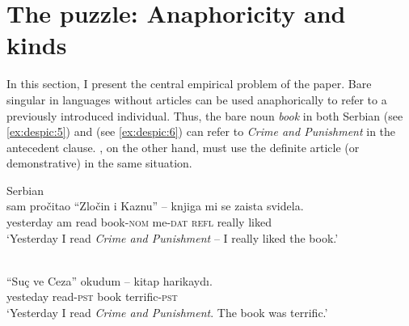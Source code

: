 \documentclass[output=paper,
modfonts
]{langscibook}
\begin{document}
	\section{The puzzle: Anaphoricity and kinds } \label{sec:despic:2}
	
	In this section, I present the central empirical problem of the paper. Bare singular  in languages without articles can be used anaphorically to refer to a previously introduced individual. Thus, the bare noun \textit{book} in both Serbian (see \ref{ex:despic:5}) and  (see \ref{ex:despic:6}) can refer to \textit{Crime and Punishment} in the antecedent clause. , on the other hand, must use the definite article (or demonstrative) in the same situation. 
	
	\ea \label{ex:despic:5}
	Serbian \\
	  {sam} {pro\v citao} {``Zlo\v cin   i      Kaznu''} --     {knjiga}       {mi}        {se} {zaista} {svidela}. \\
	yesterday am   read  \phantom{``}{Crime and Punishment}  {} book-\textsc{nom} me-\textsc{dat} \textsc{refl} really liked\\ 
	\glt `Yesterday I read \textit{Crime and Punishment} -- I really liked the book.'
	\z 
	
	\ea \label{ex:despic:6}
	 \\
	         {``Su\c c      ve   Ceza''}          {okudum} --   {kitap} {harikayd\i}.\\
	yesteday \phantom{``}{Crime and Punishment} read-\textsc{pst} {} book terrific-\textsc{pst}\\ 
	\glt `Yesterday I read \textit{Crime and Punishment}. The book was terrific.'
	\z 
	
\end{document}

